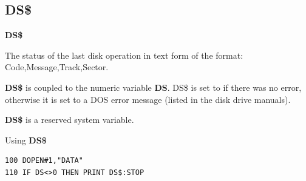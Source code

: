 \subsection{DS\$}
\begin{description}[leftmargin=2cm,style=nextline]
\item [Format:] {\bf DS\$}
\item [Usage:]  The status of the last disk operation
                in text form of the format:
                Code,Message,Track,Sector.

                {\bf DS\$} is coupled to the numeric variable {\bf DS}.
                DS\$ is set to  if there was no error, otherwise
                it is set to a DOS error message (listed in the
                disk drive manuals).
\item[Remarks:] {\bf DS\$} is a reserved system variable.

\item [Example:] Using {\bf DS\$}
\begin{tcolorbox}[colback=black,coltext=white]
\verbatimfont{\codefont}
\begin{verbatim}
100 DOPEN#1,"DATA"
110 IF DS<>0 THEN PRINT DS$:STOP
\end{verbatim}
\end{tcolorbox}
\end{description}


\newpage
